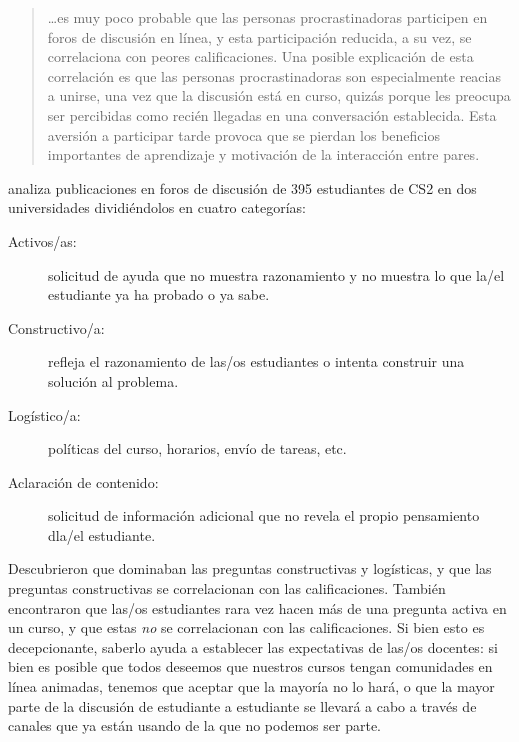\begin{quote}

  {\ldots}es muy poco probable que las personas procrastinadoras participen en foros de discusión en línea,
  y esta participación reducida,
  a su vez,
  se correlaciona con peores calificaciones.
  Una posible explicación de esta correlación es que
  las personas procrastinadoras son especialmente reacias a unirse, una vez que la discusión está en curso,
  quizás porque les preocupa ser percibidas como recién llegadas en una conversación establecida.
  Esta aversión a participar tarde
  provoca que se pierdan los beneficios importantes de aprendizaje y motivación de la interacción entre pares.

\end{quote}

\cite{Vell2017} analiza publicaciones en foros de discusión de 395 estudiantes de CS2 en dos universidades
dividiéndolos en cuatro categorías:

\begin{description}

\item[Activos/as:]
  solicitud de ayuda que no muestra razonamiento
  y no muestra lo que la/el estudiante ya ha probado o ya sabe.

\item[Constructivo/a:]
  refleja el razonamiento de las/os estudiantes
  o intenta construir una solución al problema.

\item[Logístico/a:]
  políticas del curso, horarios, envío de tareas, etc.
  
\item[Aclaración de contenido:]
  solicitud de información adicional
  que no revela el propio pensamiento dla/el estudiante.

\end{description}

Descubrieron que dominaban las preguntas constructivas y logísticas,
y que las preguntas constructivas se correlacionan con las calificaciones.
También encontraron que las/os estudiantes rara vez hacen más de una pregunta activa en un curso,
y que estas \emph{no} se correlacionan con las calificaciones.
Si bien esto es decepcionante,
saberlo ayuda a establecer las expectativas de las/os docentes:
si bien es posible que todos deseemos que nuestros cursos tengan comunidades en línea animadas,
tenemos que aceptar que la mayoría no lo hará,
o que la mayor parte de la discusión de estudiante a estudiante se llevará a cabo
a través de canales que ya están usando
de la que no podemos ser parte.

